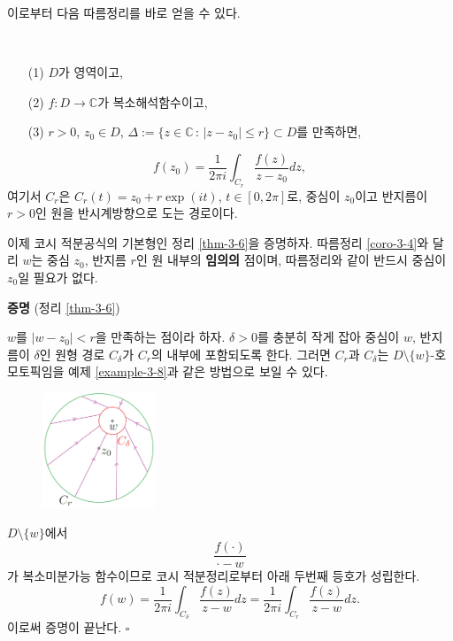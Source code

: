 이로부터 다음 따름정리를 바로 얻을 수 있다.

\begin{salt_corollary} \label{coro-3-4}
\
\begin{itemize}
\item[(1)] $D$가 영역이고, 
\item[(2)] $f:D\to\mathbb C$가 복소해석함수이고,
\item[(3)] $r>0$, $z_0\in D$, 
$\Delta := \{ z\in \mathbb C\,:\, |z-z_0| \le r\} \subset D$를 만족하면,
\end{itemize}
\[
f(z_0) = \dfrac1{2\pi i} \int_{C_r} \dfrac{f(z)}{z-z_0} dz,
\]
여기서 $C_r$은 $C_r(t) = z_0 + r\exp(it)$, $t\in [0,2\pi]$로,
중심이 $z_0$이고 반지름이 $r>0$인 
원을 반시계방향으로 도는 경로이다.
\end{salt_corollary}

이제 코시 적분공식의 기본형인 정리 \ref{thm-3-6}을 증명하자.
따름정리 \ref{coro-3-4}와 달리
$w$는 중심 $z_0$, 반지름 $r$인 원 내부의 {\bf 임의의} 점이며,
따름정리와 같이 반드시 중심이 $z_0$일 필요가 없다.


{\bf 증명} (정리 \ref{thm-3-6})

$w$를 $|w-z_0| <r$을 만족하는 점이라 하자.
$\delta>0$를 충분히 작게 잡아 
중심이 $w$, 반지름이 $\delta$인 원형 경로 $C_\delta$가 $C_r$의 내부에 포함되도록 한다.
그러면 $C_r$과 $C_\delta$는 $D\setminus\{w\}$-호모토픽임을
예제 \ref{example-3-8}과 같은 방법으로 보일 수 있다.

\begin{figure}[h!]
\begin{center}
\includegraphics[width=0.3\textwidth]{./SaltChapter/figs/fig-3-0-9}
\end{center}
\end{figure}
$D\setminus\{w\}$에서
\[
\dfrac{f(\cdot)}{\cdot - w}
\]
가 복소미분가능 함수이므로 코시 적분정리로부터 아래 두번째 등호가 성립한다.
\[
f(w) = \dfrac 1{2\pi i} \int_{C_\delta} \dfrac{f(z)}{z-w}dz
= \dfrac 1{2\pi i} \int_{C_r} \dfrac{f(z)}{z-w}dz.
\]
이로써 증명이 끝난다. \hfill $\square$


